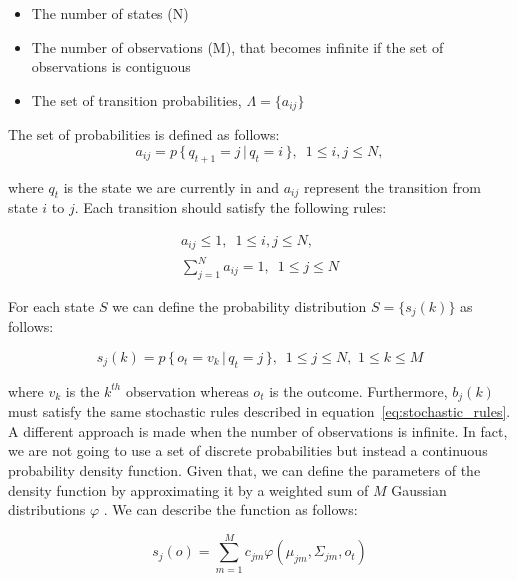 \begin{itemize}
	\item The number of states (N)
	\item The number of observations (M), that becomes infinite if the set of observations is contiguous
	\item The set of transition probabilities, $\Lambda = \{ a_{ij}\}$
\end{itemize}

The set of probabilities is defined as follows:
\begin{equation}
\label{eq:transition_probabilities}
a_{ij} = p \, \{ \, q_{t+1} = j \, | \, q_{t} = i \, \}, \, \, \, 1 \leq i,j \leq N,
\end{equation}

\noindent where $q_{t}$ is the state we are currently in and $a_{ij}$ represent the transition from state $i$ to $j$.
Each transition should satisfy the following rules:

\begin{subequations}
	\label{eq:stochastic_rules}
	\begin{align}
	a_{ij} \le 1, \, \, \, 1 \leq i,j \leq N, \\ %
	\sum_{j=1}^{N} a_{ij} = 1, \, \, \, 1 \leq j \leq N
	\end{align}
\end{subequations}

\noindent For each state $S$ we can define the probability distribution $S = \{s_{j}(k)\}$ as follows:

\begin{equation}
s_{j}(k) = p \, \{\, o_{t} = v_{k} \, | \, q_{t} = j \, \}, \, \, \, 1 \leq j \leq N, \,\, 1 \leq k \leq M
\end{equation}

\noindent where $v_k$ is the $k^{th}$ observation whereas $o_{t}$ is the outcome. Furthermore, $b_{j}(k)$ must satisfy the same stochastic rules described in equation~\ref{eq:stochastic_rules}. \\

\noindent A different approach is made when the number of observations is infinite. In fact, we are not going to use a set of discrete probabilities but instead a continuous probability density function. Given that, we can define the parameters of the density function by approximating it by a weighted sum of $M$ Gaussian distributions $\varphi$ \cite{def_hmm}. We can describe the function as follows:

\begin{equation}
	s_{j}(o) = \sum_{m = 1}^{M} c_{jm}\varphi (\mu_{jm}, \Sigma_{jm}, o_{t})
\end{equation}

